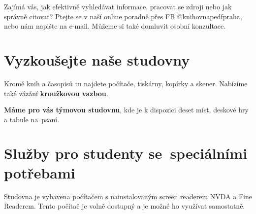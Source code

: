 Zajímá vás, jak efektivně vyhledávat informace, pracovat se zdroji nebo jak
správně citovat? Ptejte se v naší online poradně přes FB @knihovnapedfpraha,
nebo nám napište na e-mail. Můžeme si také domluvit osobní konzultace. 



\ikonka{\faGraduationCap}
\section{Vyzkoušejte naše studovny}

Kromě knih a časopisů tu najdete počítače, tiskárny, kopírky a
skener. Nabízíme také vázání \textbf{kroužkovou vazbou}. 




\textbf{Máme pro vás týmovou studovnu},  kde je k dispozici deset míst, deskové hry
a tabule na~psaní.





\bigskip
\ikonka{\faHeart}
\section{Služby pro studenty se~speciálními potřebami}

Studovna je vybavena počítačem s nainstalovaným screen readerem NVDA a Fine
Readerem. Tento počítač je volně dostupný a je možné ho využívat samostatně.

